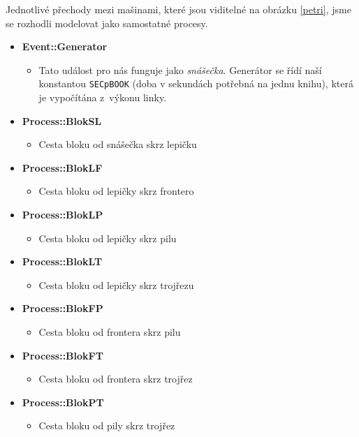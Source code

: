 \documentclass[a4paper, 11pt]{article}
\begin{document}
Jednotlivé přechody mezi mašinami, které jsou viditelné na obrázku \ref{petri}, jsme se rozhodli modelovat jako samostatné procesy.

\begin{itemize}
	\item \textbf{Event::Generator}
	\begin{itemize}
		\item  Tato událost pro nás funguje jako \emph{snášečka}. Generátor se řídí naší konstantou \texttt{SECpBOOK} (doba v sekundách potřebná na jednu knihu), která je vypočítána z~výkonu linky.
	\end{itemize}

	\item \textbf{Process::BlokSL}
	\begin{itemize}
		\item Cesta bloku od snášečka skrz lepičku
	\end{itemize}
	
	\item \textbf{Process::BlokLF}
	\begin{itemize}
		\item Cesta bloku od lepičky skrz frontero
	\end{itemize}
	
	\item \textbf{Process::BlokLP}
	\begin{itemize}
		\item Cesta bloku od lepičky skrz pilu
	\end{itemize}
	
	\item \textbf{Process::BlokLT}
	\begin{itemize}
		\item Cesta bloku od lepičky skrz trojřezu
	\end{itemize}
	
	\item \textbf{Process::BlokFP}
	\begin{itemize}
		\item Cesta bloku od frontera skrz pilu
	\end{itemize}
	
	\item \textbf{Process::BlokFT}
	\begin{itemize}
		\item Cesta bloku od frontera skrz trojřez
	\end{itemize}
	
	\item \textbf{Process::BlokPT}
	\begin{itemize}
		\item Cesta bloku od pily skrz trojřez
	\end{itemize}
	

\end{itemize}
\end{document}

